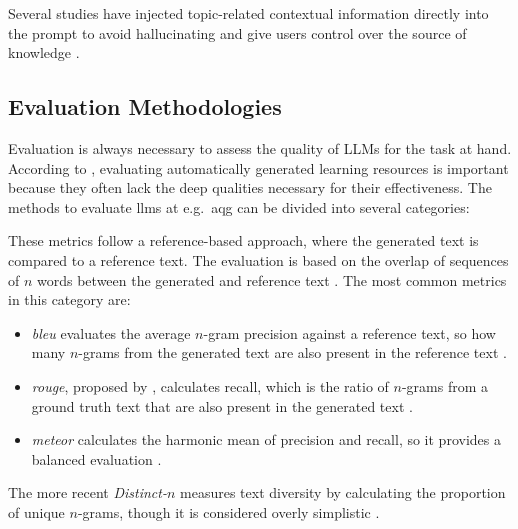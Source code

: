  Several studies \cite{biancini_multiple-choice_2024,blobstein_angel_2023,wang_towards_2022,bhowmick_automating_2023} have injected topic-related contextual information directly into the prompt to avoid hallucinating and give users control over the source of knowledge \cite{biancini_multiple-choice_2024}.

\vp

\subsection{Evaluation Methodologies}

Evaluation is always necessary to assess the quality of LLMs for the task at hand. According to \cite{doughty_comparative_2024}, evaluating automatically generated learning resources is important because they often lack the deep qualities necessary for their effectiveness.
The methods to evaluate \ac{llms} at e.g.\ \ac{aqg} can be divided into several categories:

 These metrics follow a reference-based approach, where the generated text is compared to a reference text. The evaluation is based on the overlap of sequences of $n$ words between the generated and reference text \cite{guo_survey_2024}. The most common metrics in this category are:
\begin{itemize}
   \item \textit{\ac{bleu}} \cite{papineni_bleu_2001} evaluates the average $n$-gram precision against a reference text, so how many $n$-grams from the generated text are also present in the reference text \cite{guo_survey_2024}.
   \item \textit{\ac{rouge}}, proposed by \cite{lin_rouge_2004}, calculates recall, which is the ratio of $n$-grams from a ground truth text that are also present in the generated text \cite{guo_survey_2024}.
   \item \textit{\ac{meteor}} \cite{banerjee_meteor_2005} calculates the harmonic mean of precision and recall, so it provides a balanced evaluation \cite{guo_survey_2024}.
\end{itemize}


 The more recent \textit{Distinct-}$n$ \cite{li_diversity-promoting_2016} measures text diversity by calculating the proportion of unique $n$-grams, though it is considered overly simplistic \cite{guo_survey_2024}.

